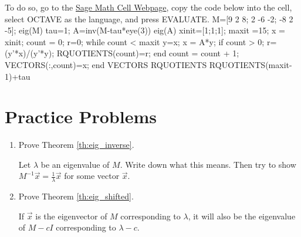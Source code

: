 \documentclass{ximera}
\begin{document}
To do so, go to the \href{https://sagecell.sagemath.org/}{Sage Math Cell Webpage}, copy the code below into the cell, select OCTAVE as the language, and press EVALUATE.
M=[9 2 8; 2 -6 -2; -8 2 -5];
eig(M)
tau=1;
A=inv(M-tau*eye(3)) %
eig(A)
xinit=[1;1;1]; %
maxit =15; %
x = xinit;
count = 0;
r=0;
    while count < maxit
    y=x;
    x = A*y;
        if count > 0; 
        r=(y'*x)/(y'*y);
        RQUOTIENTS(count)=r;
        end
    count = count + 1;
    VECTORS(:,count)=x;
end
VECTORS
RQUOTIENTS
RQUOTIENTS(maxit-1)+tau

\section*{Practice Problems}

\begin{problem}\label{prob:complete_eig_proofs}

\begin{enumerate}
    \item Prove Theorem \ref{th:eig_inverse}.
    \begin{hint}
    Let $\lambda$ be an eigenvalue of $M$.  Write down what this means.  Then try to show $M^{-1}\vec{x} = \frac{1}{\lambda}\vec{x}$ for some vector $\vec{x}$.
    \end{hint}
    
    \item Prove Theorem \ref{th:eig_shifted}.
    \begin{hint}
    If $\vec{x}$ is the eigenvector of $M$ corresponding to $\lambda$, it will also be the eigenvalue of $M-cI$ corresponding to $\lambda - c$. 
    \end{hint}
\end{enumerate}

\end{problem}
\end{document}
